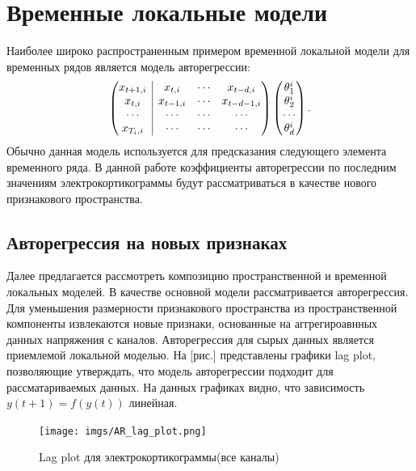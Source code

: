 \documentclass{mipt-thesis-bs}
\begin{document}
\section{Временные локальные модели}
Наиболее широко распространенным примером временной локальной модели для временных рядов является модель авторегрессии:
\begin{equation}
\left(\begin{array}{@{}c|ccc@{}}
x_{t+1,i} & x_{t,i}   & \cdots & x_{t-d,i}   \\
x_{t,i}   & x_{t-1,i} & \cdots & x_{t-d-1,i} \\
\cdots     & \cdots     & \cdots & \cdots	\\
x_{T_{i},i}   & \cdots     & \cdots & \cdots   \\
\end{array}\right)
\begin{pmatrix}
\theta_1^{i} \\
\theta_2^{i} \\
\cdots \\
\theta_d^{i}
\end{pmatrix}.
\end{equation}
Обычно данная модель используется для предсказания следующего элемента временного ряда. В данной работе коэффициенты авторегрессии по последним значениям электрокортикограммы будут рассматриваться в качестве нового признакового пространства. 

\subsection{Авторегрессия на новых признаках}

Далее предлагается рассмотреть композицию пространственной и временной локальных моделей. 
В качестве основной модели рассматривается авторегрессия. Для уменьшения размерности признакового пространства из пространственной компоненты извлекаются новые признаки, основанные на аггрегироавнных данных напряжения с каналов. 
Авторегрессия для сырых данных является приемлемой локальной моделью. На [рис.] представлены графики lag plot, позволяющие утверждать, что модель авторегрессии подходит для рассматариваемых данных. На данных графиках видно, что зависимость $y(t+1) = f(y(t))$ линейная.	

\begin{figure}[h]
\begin{center}
	\texttt{[image: imgs/AR\_lag\_plot.png]}
	\caption{Lag plot для электрокортикограммы(все каналы)}	
	\label{fig:ar_ecog}
	\end{center}
\end{figure}
\end{document}
